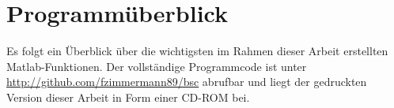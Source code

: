 \chapter{Programmüberblick}
Es folgt ein Überblick über die wichtigsten im Rahmen dieser Arbeit erstellten Matlab-Funktionen. Der vollständige Programmcode ist unter {\url{http://github.com/fzimmermann89/bsc}} abrufbar und liegt der gedruckten Version dieser Arbeit in Form einer CD-ROM bei.
 
